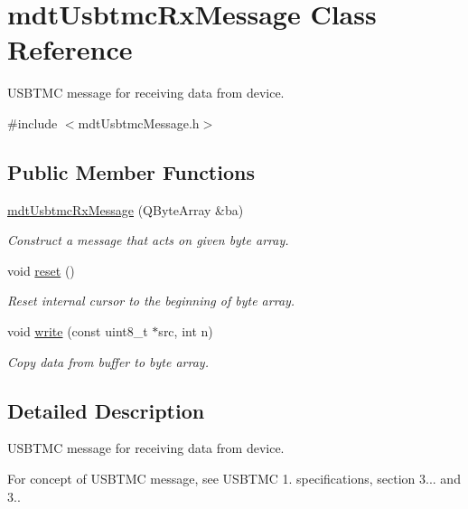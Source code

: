 \hypertarget{classmdt_usbtmc_rx_message}{\section{mdt\-Usbtmc\-Rx\-Message Class Reference}
\label{classmdt_usbtmc_rx_message}
}


U\-S\-B\-T\-M\-C message for receiving data from device.  




{\ttfamily \#include $<$mdt\-Usbtmc\-Message.\-h$>$}

\subsection*{Public Member Functions}
\begin{DoxyCompactItemize}
\item 
\hyperlink{classmdt_usbtmc_rx_message_a0f902a26924d200af2479a90f2428843}{mdt\-Usbtmc\-Rx\-Message} (Q\-Byte\-Array \&ba)
\begin{DoxyCompactList}\small\item\em Construct a message that acts on given byte array. \end{DoxyCompactList}\item 
void \hyperlink{classmdt_usbtmc_rx_message_af4e731a1d8805b2ab559aaf4b71dac2a}{reset} ()
\begin{DoxyCompactList}\small\item\em Reset internal cursor to the beginning of byte array. \end{DoxyCompactList}\item 
void \hyperlink{classmdt_usbtmc_rx_message_a1aecc64d17026278c5c41a082c6a4903}{write} (const uint8\-\_\-t $\ast$src, int n)
\begin{DoxyCompactList}\small\item\em Copy data from buffer to byte array. \end{DoxyCompactList}\end{DoxyCompactItemize}


\subsection{Detailed Description}
U\-S\-B\-T\-M\-C message for receiving data from device. 

For concept of U\-S\-B\-T\-M\-C message, see U\-S\-B\-T\-M\-C 1. specifications, section 3... and 3.. 

